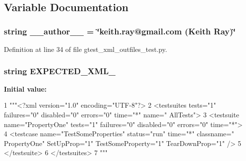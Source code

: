 \subsection{\-Variable \-Documentation}
\hypertarget{namespacegtest__xml__outfiles__test_a629d61dfe4da763164a4d1a2d85b0afd}{
\subsubsection[{\-\_\-\-\_\-author\-\_\-\-\_\-}]{\setlength{\rightskip}{0pt plus 5cm}string {\bf \-\_\-\-\_\-author\-\_\-\-\_\-} = \char`\"{}keith.\-ray@gmail.\-com (\-Keith \-Ray)\char`\"{}}}\label{da/d3e/namespacegtest__xml__outfiles__test_a629d61dfe4da763164a4d1a2d85b0afd}


\-Definition at line 34 of file gtest\-\_\-xml\-\_\-outfiles\-\_\-test.\-py.

\hypertarget{namespacegtest__xml__outfiles__test_a8ebc16bb692227f33ccb6882d8d5f2d5}{
\subsubsection[{\-E\-X\-P\-E\-C\-T\-E\-D\-\_\-\-X\-M\-L\-\_\-1}]{\setlength{\rightskip}{0pt plus 5cm}string {\bf \-E\-X\-P\-E\-C\-T\-E\-D\-\_\-\-X\-M\-L\-\_}}}\label{da/d3e/namespacegtest__xml__outfiles__test_a8ebc16bb692227f33ccb6882d8d5f2d5}
{\bfseries \-Initial value\-:}
\begin{DoxyCode}
1 """<?xml version="1.0" encoding="UTF-8"?>
2 <testsuites tests="1" failures="0" disabled="0" errors="0" time="*" name="
      AllTests">
3   <testsuite name="PropertyOne" tests="1" failures="0" disabled="0" errors="0"
       time="*">
4     <testcase name="TestSomeProperties" status="run" time="*" classname="
      PropertyOne" SetUpProp="1" TestSomeProperty="1" TearDownProp="1" />
5   </testsuite>
6 </testsuites>
7 """
\end{DoxyCode}


